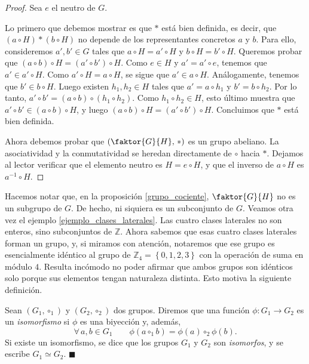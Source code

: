 \begin{proof}
Sea $e$ el neutro de $G$.

Lo primero que debemos mostrar es que $\ast$ está bien definida, es decir, que $\left(a \circ H \right) \ast \left( b \circ H \right)$ no depende de los representantes concretos $a$ y $b$. Para ello, consideremos $a', b' \in G$ tales que $a \circ H = a' \circ H$ y $b \circ H = b' \circ H$. Queremos probar que $(a \circ b) \circ H = (a' \circ b') \circ H$. Como $e \in H$ y $a' = a' \circ e$, tenemos que $a' \in a' \circ H$. Como $a' \circ H = a \circ H$, se sigue que $a' \in a \circ H$. Análogamente, tenemos que $b' \in b \circ H$. Luego existen $h_1, h_2 \in H$ tales que $a' = a \circ h_1$ y $b' = b \circ h_2$. Por lo tanto, $a' \circ b' = (a \circ b) \circ (h_1 \circ h_2)$. Como $h_1 \circ h_2 \in H$, esto último muestra que $a' \circ b' \in (a \circ b) \circ H$, y luego $(a \circ b) \circ H = (a' \circ b') \circ H$. Concluimos que $\ast$ está bien definida.

Ahora debemos probar que $\left(\faktor{G}{H},\, \ast\right)$ es un grupo abeliano. La asociatividad y la conmutatividad se heredan directamente de $\circ$ hacia $\ast$. Dejamos al lector verificar que el elemento neutro es $H = e \circ H$, y que el inverso de $a \circ H$ es $a^{-1} \circ H$.
\end{proof}

Hacemos notar que, en la proposición \ref{grupo_cociente}, $\faktor{G}{H}$ no es un subgrupo de $G$. De hecho, ni siquiera es un subconjunto de $G$. Veamos otra vez el ejemplo \ref{ejemplo_clases_laterales}. Las cuatro clases laterales no son enteros, sino subconjuntos de $\mathbb{Z}$. Ahora sabemos que esas cuatro clases laterales forman un grupo, y, si miramos con atención, notaremos que ese grupo es esencialmente idéntico al grupo de $\mathbb{Z}_4 = \left\{0, 1, 2, 3\right\}$ con la operación de suma en módulo $4$. Resulta incómodo no poder afirmar que ambos grupos son idénticos solo porque sus elementos tengan naturaleza distinta. Esto motiva la siguiente definición.

\begin{definition}[Isomorfismo] \label{isomorfismo_de_grupo}
Sean $(G_1, \circ_1)$ y $(G_2, \circ_2)$ dos grupos. Diremos que una función $\phi\colon G_1 \rightarrow G_2$ es un \emph{isomorfismo} si $\phi$ es una biyección y, además,
$$\forall\, a, b \in G_1 \qquad \phi(a \circ_1 b) = \phi(a) \circ_2 \phi(b).$$
Si existe un isomorfismo, se dice que los grupos $G_1$ y $G_2$ son \emph{isomorfos}, y se escribe $G_1 \simeq G_2$. \hfill$\blacksquare$
\end{definition}

